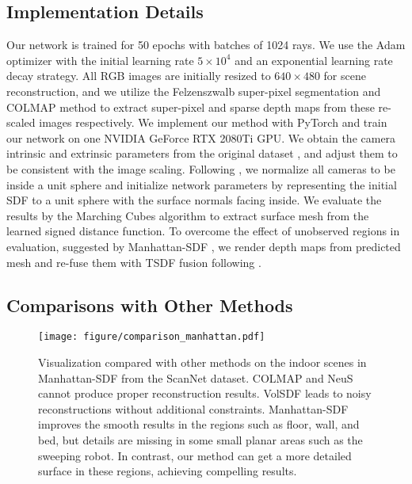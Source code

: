 \documentclass[10pt,journal,compsoc]{IEEEtran}
\begin{document}
\subsection{Implementation Details}
Our network is trained for 50 epochs with batches of 1024 rays. We use the Adam optimizer \cite{kingma2014adam} with the initial learning rate $5\times10^4$ and an exponential learning rate decay strategy. 
All RGB images are initially resized to $640\times480$ for scene reconstruction, and we utilize the Felzenszwalb super-pixel segmentation \cite{felzenszwalb2004efficient} and COLMAP \cite{schonberger2016structure} method to extract super-pixel and sparse depth maps from these re-scaled images respectively.
We implement our method with PyTorch \cite{paszke2019pytorch} and train our network on one NVIDIA GeForce RTX 2080Ti GPU. 
We obtain the camera intrinsic and extrinsic parameters 
from the original dataset \cite{dai2017scannet}, and adjust them to be consistent with the image scaling. Following \cite{atzmon2020sal}, we normalize all cameras to be inside a unit sphere and initialize network parameters by representing the initial SDF to a unit sphere with the surface normals facing inside. We evaluate the results by the Marching Cubes algorithm \cite{lorensen1987marching} to extract surface mesh from the learned signed distance function. To overcome the effect of unobserved regions in evaluation, suggested by Manhattan-SDF \cite{guo2022neural}, we render depth maps from predicted mesh and re-fuse them with TSDF fusion \cite{izadi2011kinectfusion} following \cite{murez2020atlas}.

\subsection{Comparisons with Other Methods}
\begin{figure*}[htbp]
	\centering
	\texttt{[image: figure/comparison\_manhattan.pdf]}
	\caption{Visualization compared with other methods on the indoor scenes in Manhattan-SDF \cite{guo2022neural} from the ScanNet dataset. COLMAP \cite{schonberger2016structure} and NeuS \cite{wang2021neus} cannot produce proper reconstruction results. VolSDF \cite{yariv2021volume} leads to noisy reconstructions without additional constraints. Manhattan-SDF improves the smooth results in the regions such as floor, wall, and bed, but details are missing in some small planar areas such as the sweeping robot. In contrast, our method can get a more detailed surface in these regions, achieving compelling results.}
	\label{fig:ori_scenes}
\end{figure*}
\end{document}
